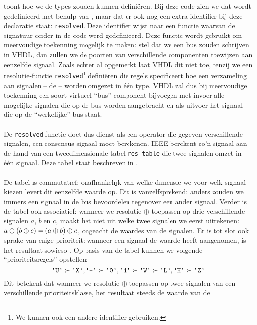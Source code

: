  toont hoe we de types zouden kunnen defini\"eren. Bij deze code zien we dat  wordt gedefinieerd met behulp van , maar dat er ook nog een extra identifier bij deze declaratie staat: \texttt{resolved}. Deze identifier wijst naar een functie waarvan de signatuur eerder in de code werd gedefinieerd. Deze functie wordt gebruikt om meervoudige toekenning mogelijk te maken: stel dat we een bus zouden schrijven in VHDL, dan zullen we de poorten van verschillende componenten toewijzen aan eenzelfde signaal. Zoals echter al opgemerkt laat VHDL dit niet toe, tenzij we een resolutie-functie \texttt{resolved}\footnote{We kunnen ook een andere identifier gebruiken.} defini\"eren die regels specificeert hoe een verzameling aan signalen -- de  -- worden omgezet in \'e\'en type. VHDL zal dus bij meervoudige toekenning een soort virtueel ``bus''-component bijvoegen met invoer alle mogelijke signalen die op de bus worden aangebracht en als uitvoer het signaal die op de ``werkelijke'' bus staat.

\paragraph{}
De \texttt{resolved} functie doet dus dienst als een operator die gegeven verschillende signalen, een consensus-signaal moet berekenen. IEEE berekent zo'n signaal aan de hand van een tweedimensionale tabel \texttt{res\_table} die twee signalen omzet in \'e\'en signaal. Deze tabel staat beschreven in .


\paragraph{}
De tabel is commutatief: onafhankelijk van welke dimensie we voor welk signaal kiezen levert dit eenzelfde waarde op. Dit is vanzelfsprekend: anders zouden we immers een signaal in de bus bevoordelen tegenover een ander signaal. Verder is de tabel ook associatief: wanneer we resolutie $\oplus$ toepassen op drie verschillende signalen $a$, $b$ en $c$, maakt het niet uit welke twee signalen we eerst uitrekenen: $a\oplus\left( b\oplus c \right)=\left( a\oplus b \right)\oplus c$, ongeacht de waardes van de signalen. Er is tot slot ook sprake van enige prioriteit: wanneer een signaal de waarde  heeft aangenomen, is het resultaat sowieso . Op basis van de tabel kunnen we volgende ``prioriteitsregels'' opstellen:
\begin{equation}
\vhdltermen{'U'}\succ\vhdltermen{'X'},\vhdltermen{'-'}\succ\vhdltermen{'0'},\vhdltermen{'1'}\succ\vhdltermen{'W'}\succ\vhdltermen{'L'},\vhdltermen{'H'}\succ\vhdltermen{'Z'}
\end{equation}
Dit betekent dat wanneer we resolutie $\oplus$ toepassen op twee signalen van een verschillende prioriteitsklasse, het resultaat steeds de waarde van de 

